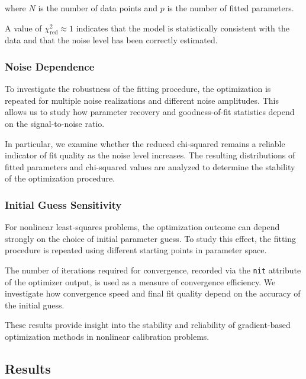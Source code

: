 \documentclass{article}
\begin{document}
where $N$ is the number of data points and $p$ is the number of fitted parameters.

A value of $\chi^2_{\mathrm{red}} \approx 1$ indicates that the model is statistically consistent with the data and that the noise level has been correctly estimated.

\FloatBarrier

\subsubsection{Noise Dependence}

To investigate the robustness of the fitting procedure, the optimization is repeated for multiple noise realizations and different noise amplitudes. This allows us to study how parameter recovery and goodness-of-fit statistics depend on the signal-to-noise ratio.

In particular, we examine whether the reduced chi-squared remains a reliable indicator of fit quality as the noise level increases. The resulting distributions of fitted parameters and chi-squared values are analyzed to determine the stability of the optimization procedure.

\FloatBarrier

\subsubsection{Initial Guess Sensitivity}

For nonlinear least-squares problems, the optimization outcome can depend strongly on the choice of initial parameter guess. To study this effect, the fitting procedure is repeated using different starting points in parameter space.

The number of iterations required for convergence, recorded via the \texttt{nit} attribute of the optimizer output, is used as a measure of convergence efficiency. We investigate how convergence speed and final fit quality depend on the accuracy of the initial guess.

These results provide insight into the stability and reliability of gradient-based optimization methods in nonlinear calibration problems.
\FloatBarrier


\subsection{Results}
\end{document}

